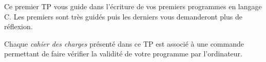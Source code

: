 
Ce premier TP vous guide dans l'écriture de vos premiers programmes en langage C.  Les premiers sont très guidés puis les derniers vous demanderont plus de réflexion.

Chaque \textit{cahier des charges} présenté dans ce TP est associé à une commande permettant de faire vérifier la validité de votre programme par l'ordinateur.





